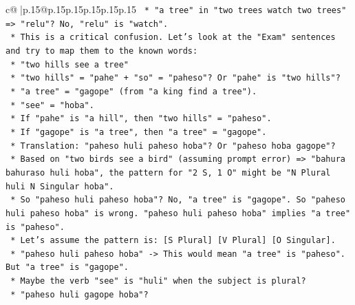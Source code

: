 \documentclass{article}
\begin{document}
{\begin{supertabular}{c@{$\;$}|p{.15\linewidth}@{}p{.15\linewidth}p{.15\linewidth}p{.15\linewidth}p{.15\linewidth}p{.15\linewidth}}
{{{\texttt{                                            *   "a tree" in "two trees watch two trees" => "relu"? No, "relu" is "watch".} \\
\texttt{                                            *   This is a critical confusion. Let's look at the "Exam" sentences and try to map them to the known words:} \\
\texttt{                                                *   "two hills see a tree"} \\
\texttt{                                                    *   "two hills" = "pahe" + "so" = "paheso"? Or "pahe" is "two hills"?} \\
\texttt{                                                    *   "a tree" = "gagope" (from "a king find a tree").} \\
\texttt{                                                    *   "see" = "hoba".} \\
\texttt{                                                    *   If "pahe" is "a hill", then "two hills" = "paheso".} \\
\texttt{                                                    *   If "gagope" is "a tree", then "a tree" = "gagope".} \\
\texttt{                                                    *   Translation: "paheso huli paheso hoba"? Or "paheso hoba gagope"?} \\
\texttt{                                                    *   Based on "two birds see a bird" (assuming prompt error) => "bahura bahuraso huli hoba", the pattern for "2 S, 1 O" might be "N Plural huli N Singular hoba".} \\
\texttt{                                                    *   So "paheso huli paheso hoba"? No, "a tree" is "gagope". So "paheso huli paheso hoba" is wrong. "paheso huli paheso hoba" implies "a tree" is "paheso".} \\
\texttt{                                                    *   Let's assume the pattern is: {[}S Plural{]} {[}V Plural{]} {[}O Singular{]}.} \\
\texttt{                                                    *   "paheso huli paheso hoba" {-}> This would mean "a tree" is "paheso". But "a tree" is "gagope".} \\
\texttt{                                                    *   Maybe the verb "see" is "huli" when the subject is plural?} \\
\texttt{                                                    *   "paheso huli gagope hoba"?} \\
}}}
\end{supertabular}}
\end{document}
